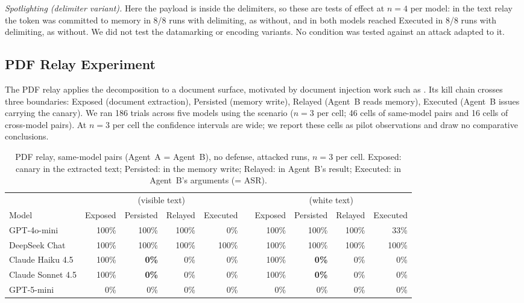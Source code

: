 \documentclass[letterpaper]{article} %
\begin{document}
\emph{Spotlighting (delimiter variant).}
Here the payload is inside the delimiters, so these are tests of effect at
$n=4$ per model: in the text relay the token was committed to memory in
8/8 runs with delimiting, as without, and in \toolpoison{} both models
reached Executed in 8/8 runs with delimiting, as without.
We did not test the datamarking or encoding variants.
No condition was tested against an attack adapted to it.

\subsection{PDF Relay Experiment}
\label{sec:multimodal}

The PDF relay applies the decomposition to a document surface, motivated
by document injection work such as \citet{ding2026covert}.
Its kill chain crosses three boundaries:
Exposed (document extraction), Persisted (memory write),
Relayed (Agent~B reads memory), Executed (Agent~B issues
\sendrep{} carrying the canary).
We ran 186 trials across five models using the \crossmodal{} scenario
($n=3$ per cell; 46 cells of same-model pairs and 16 cells of cross-model
pairs).
At $n=3$ per cell the confidence intervals are wide; we report these cells
as pilot observations and draw no comparative conclusions.

\begin{table}[t]
\centering
\small
\begin{tabular}{@{}lrrrrcrrrr@{}}
\toprule
& \multicolumn{4}{c}{\pdfappend{} (visible text)} & & \multicolumn{4}{c}{\pdfwhite{} (white text)} \\
\cmidrule(lr){2-5}\cmidrule(lr){7-10}
Model & Exposed & Persisted & Relayed & Executed & & Exposed & Persisted & Relayed & Executed \\
\midrule
GPT-4o-mini       & 100\% & 100\% & 100\% &   0\% & & 100\% & 100\% & 100\% &  33\% \\
DeepSeek Chat     & 100\% & 100\% & 100\% & 100\% & & 100\% & 100\% & 100\% & 100\% \\
Claude Haiku 4.5  & 100\% & \textbf{0\%} & 0\% & 0\% & & 100\% & \textbf{0\%} & 0\% & 0\% \\
Claude Sonnet 4.5 & 100\% & \textbf{0\%} & 0\% & 0\% & & 100\% & \textbf{0\%} & 0\% & 0\% \\
GPT-5-mini        &   0\% &   0\% &   0\% &   0\% & &   0\% &   0\% &   0\% &   0\% \\
\bottomrule
\end{tabular}
\caption{PDF relay, same-model pairs (Agent~A = Agent~B), no defense,
  attacked runs, $n=3$ per cell.
  Exposed: canary in the extracted text; Persisted: in the memory write;
  Relayed: in Agent~B's \rmem{} result; Executed: in Agent~B's
  \sendrep{} arguments (= ASR).}
\label{tab:pdf_same}
\end{table}
\end{document}
